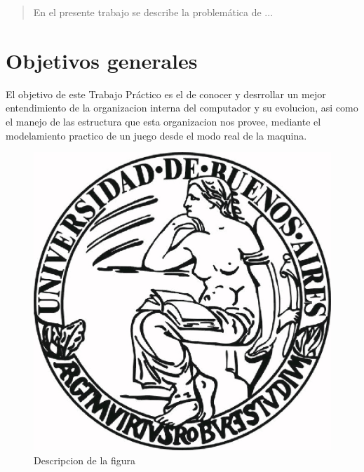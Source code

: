 \documentclass[a4paper]{article}
\begin{document}
\thispagestyle{empty}


\newpage

\thispagestyle{empty}
\vfill
\begin{abstract}
En el presente trabajo se describe la problemática de ...
\end{abstract}

\thispagestyle{empty}
\vspace{3cm}
\tableofcontents
\newpage


\newpage

\section{Objetivos generales}

El objetivo de este Trabajo Práctico es el de conocer y desrrollar un mejor entendimiento de la organizacion interna del computador y su evolucion, asi como el manejo de las estructura que esta organizacion nos provee, mediante el modelamiento practico de un juego desde el modo real de la maquina.  



\begin{figure}
  \begin{center}
	\includegraphics[scale=0.80]{imagenes/logouba.jpg}
	\caption{Descripcion de la figura}
	\label{nombreparareferenciar}
  \end{center}
\end{figure}
\end{document}
